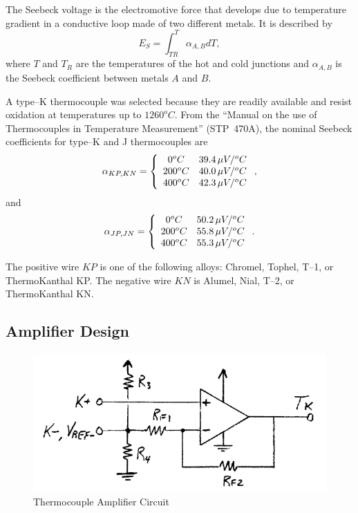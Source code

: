 \documentclass[10pt, twocolumn]{article}
\begin{document}
The Seebeck voltage is the electromotive force that develops due to temperature
gradient in a conductive loop made of two different metals. It is described by
\begin{equation}
E_{S}=\int _{TR}^{T}\alpha_{A,B}dT,
\end{equation}
where $T$ and $T_{R}$ are the temperatures of the hot and cold junctions and
$\alpha_{A,B}$ is the Seebeck coefficient between metals $A$ and $B$.

A type--K thermocouple was selected because they are readily available and
resist oxidation at temperatures up to $1260^{o}C$.
From the ``Manual on the use of Thermocouples in Temperature Measurement'' \mbox{(STP 470A)}, the nominal
Seebeck coefficients for type--K and J thermocouples are
\begin{equation}
\alpha_{KP,KN}=\left\{\begin{array}{c c}
0^{o}C		&39.4\,\mu V/^{o}C	\\
200^{o}C	&40.0\,\mu V/^{o}C	\\
400^{o}C	&42.3\,\mu V/^{o}C	\\
\end{array}\right.,
\end{equation}
and
\begin{equation}
\alpha_{JP,JN}=\left\{\begin{array}{c c}
0^{o}C		&50.2\,\mu V/^{o}C	\\
200^{o}C	&55.8\,\mu V/^{o}C	\\
400^{o}C	&55.3\,\mu V/^{o}C	\\
\end{array}\right..
\end{equation}

The positive wire $KP$ is one of the following alloys: Chromel, Tophel, T--1, or ThermoKanthal KP.
The negative wire $KN$ is Alumel, Nial, T--2, or ThermoKanthal KN.

\subsection{Amplifier Design}

\begin{figure}
	\centering
	\includegraphics[width=\columnwidth]{Figures/thermocouple-amplifier.pdf}
	\caption{Thermocouple Amplifier Circuit}
	\label{thermocouple-amplifier}
\end{figure}
\end{document}
